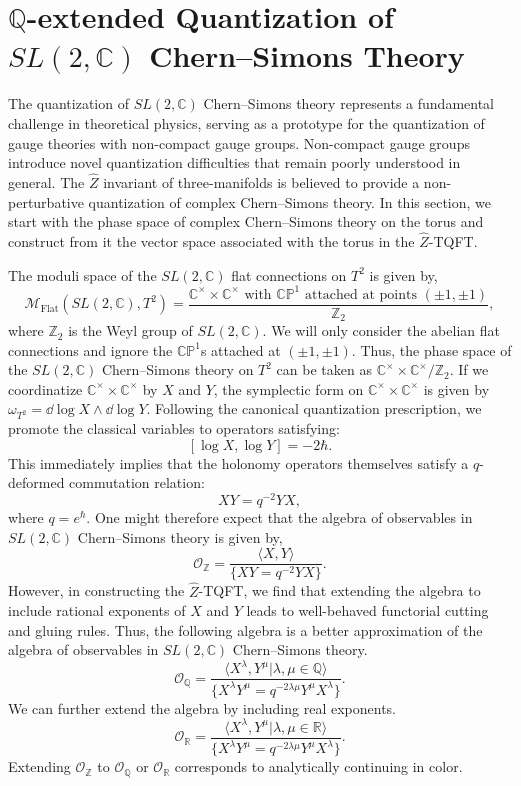 \documentclass{article}
\newcommand{\Z}{{\mathbb Z}}
\newcommand{\R}{{\mathbb R}}
\newcommand{\C}{{\mathbb C}}
\newcommand{\Q}{{\mathbb Q}}
\def\be{\begin{equation}}
\def\ee{\end{equation}}
\numberwithin{corollary}{theorem}
\numberwithin{corollary}{proposition}
\begin{document}
\section{\texorpdfstring{$\Q$}{Q}-extended Quantization of \texorpdfstring{$SL(2,\C)$}{SL(2,C)} Chern--Simons Theory}\label{torus_hilbertspace}
The quantization of $SL(2,\C)$ Chern--Simons theory represents a fundamental challenge in theoretical physics, serving as a prototype for the quantization of gauge theories with non-compact gauge groups. Non-compact gauge groups introduce novel quantization difficulties that remain poorly understood in general. The $\hat{Z}$ invariant of three-manifolds is believed to provide a non-perturbative quantization of complex Chern--Simons theory. In this section, we start with the phase space of complex Chern--Simons theory on the torus and construct from it the vector space associated with the torus in the $\hat{Z}$-TQFT.

The moduli space of the $SL(2,\C)$ flat connections on $T^{2}$ is given by,
\be 
\mathcal{M}_{\text{Flat}}(SL(2,\C),T^{2}) =
\frac{\C^{\times}\times \C^{\times} \text{ with } \mathbb{CP}^{1} \text{ attached at points } (\pm1,\pm 1) }{ \Z_{2} },
\ee 
where $\Z_{2}$ is the Weyl group of $SL(2,\C)$. We will only consider the abelian flat connections and ignore the $\mathbb{CP}^{1}$s attached at $(\pm1,\pm 1)$. Thus, the phase space of the $SL(2,\C)$ Chern--Simons theory on $T^{2}$ can be taken as $\C^{\times}\times\C^{\times} / \Z_{2}$. If we coordinatize $\C^{\times}\times\C^{\times}$ by $X$ and $Y$, the symplectic form on $\C^{\times}\times\C^{\times}$ is given by $\omega_{T^{2}} = \dd \log{X} \wedge \dd \log{Y}$. Following the canonical quantization prescription, we promote the classical variables to operators satisfying:
$$[\log{X},\log{Y}] = -2\hbar.$$
This immediately implies that the holonomy operators themselves satisfy a $q$-deformed commutation relation:
$$XY = q^{-2} Y X,$$
where $q=e^{\hbar}$. One might therefore expect that the algebra of observables in $SL(2,\C)$ Chern--Simons theory is given by, 
\be 
\mathcal{O}_{\Z}=\frac{\langle X, Y \rangle}{\{ X Y = q^{-2} Y X \} } .
\ee
However, in constructing the $\hat{Z}$-TQFT, we find that extending the algebra to include rational exponents of $X$ and $Y$ leads to well-behaved functorial cutting and gluing rules. Thus, the following algebra is a better approximation of the algebra of observables in $SL(2,\C)$ Chern--Simons theory.
\be 
\mathcal{O}_{\Q}=\frac{\langle X^{\lambda}, Y^{\mu}\vert \lambda, \mu \in \Q \rangle}{\{ X^{\lambda} Y^{\mu} = q^{-2\lambda \mu} Y^{\mu} X^{\lambda} \} } .
\ee 
We can further extend the algebra by including real exponents. 
\be 
\mathcal{O}_{\R}=\frac{\langle X^{\lambda}, Y^{\mu}\vert \lambda, \mu \in \R \rangle}{\{ X^{\lambda} Y^{\mu} = q^{-2\lambda \mu} Y^{\mu} X^{\lambda} \} }.
\ee
Extending $\mathcal{O}_{\Z}$ to $\mathcal{O}_{\Q}$ or $\mathcal{O}_{\R}$ corresponds to analytically continuing in color.
\end{document}
